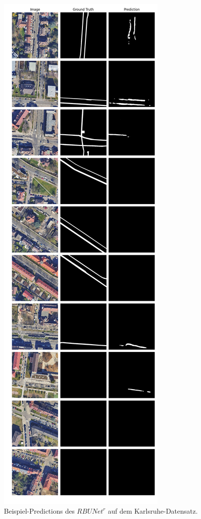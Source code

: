 \begin{figure}
	\centering
	\includegraphics[width=.41\textwidth]{Bilder/Samples-KA/rbunet-r.png} 
	\caption{Beispiel-Predictions des $RBUNet^r$ auf dem Karlsruhe-Datensatz.}
	\label{fig:ka-samples-rbunet-r}
\end{figure}

